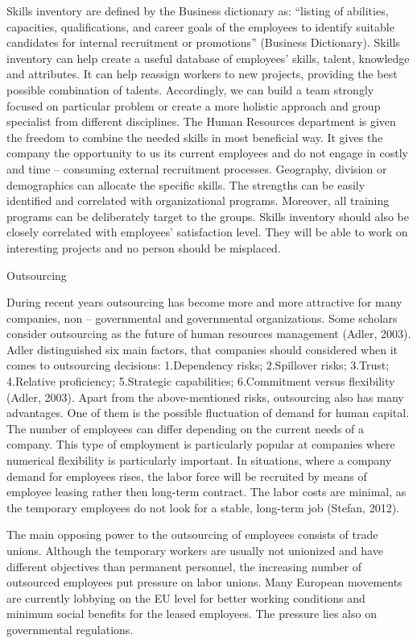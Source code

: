 \documentclass[a4paper,fleqn,11pt,dvips,titlepage]{article}
\numberwithin{figure}{section}
\numberwithin{equation}{section}
\begin{document}
Skills inventory are defined by the Business dictionary as:
“listing of abilities, capacities, qualifications, and career goals of the employees to identify suitable candidates for internal recruitment or promotions” (Business Dictionary).
Skills inventory can help create a useful database of employees’ skills, talent, knowledge and attributes. It can help reassign workers to new projects, providing the best possible combination of talents. Accordingly, we can build a team strongly focused on particular problem or create a more holistic approach and group specialist from different disciplines. The Human Resources department is given the freedom to combine the needed skills in most beneficial way. It gives the company the opportunity to us its current employees and do not engage in costly and time – consuming external recruitment processes. Geography, division or demographics can allocate the specific skills. The strengths can be easily identified and correlated with organizational programs. Moreover, all training programs can be deliberately target to the groups. Skills inventory should also be closely correlated with employees’ satisfaction level. They will be able to work on interesting projects and no person should be misplaced. 

Outsourcing 

During recent years outsourcing has become more and more attractive for many companies, non – governmental and governmental organizations. Some scholars consider outsourcing as the future of human resources management (Adler, 2003). Adler distinguished six main factors, that companies should considered when it comes to outsourcing decisions:
1.Dependency risks;
2.Spillover risks;
3.Trust;
4.Relative proficiency;
5.Strategic capabilities;
6.Commitment versus flexibility (Adler, 2003).
Apart from the above-mentioned risks, outsourcing also has many advantages. One of them is the possible fluctuation of demand for human capital. The number of employees can differ depending on the current needs of a company. This type of employment is particularly popular at companies where numerical flexibility is particularly important. In situations, where a company demand for employees rises, the labor force will be recruited by means of employee leasing rather then long-term contract. The labor costs are minimal, as the temporary employees do not look for a stable, long-term job (Stefan, 2012). 

The main opposing power to the outsourcing of employees consists of trade unions. Although the temporary workers are usually not unionized and have different objectives than permanent personnel, the increasing number of outsourced employees put pressure on labor unions. Many European movements are currently lobbying on the EU level for better working conditions and minimum social benefits for the leased employees. The pressure lies also on governmental regulations. 
\end{document}
